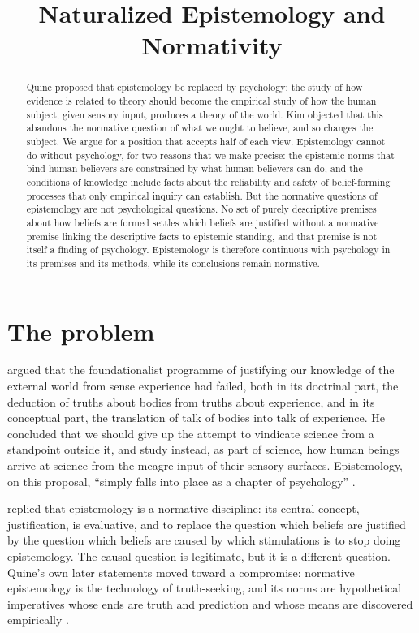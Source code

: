 \documentclass{situationist-preprint}
\title{Naturalized Epistemology and Normativity}
\begin{document}
\maketitle

\begin{abstract}
Quine proposed that epistemology be replaced by psychology: the study of how evidence is related to theory should become the empirical study of how the human subject, given sensory input, produces a theory of the world. Kim objected that this abandons the normative question of what we ought to believe, and so changes the subject. We argue for a position that accepts half of each view. Epistemology cannot do without psychology, for two reasons that we make precise: the epistemic norms that bind human believers are constrained by what human believers can do, and the conditions of knowledge include facts about the reliability and safety of belief-forming processes that only empirical inquiry can establish. But the normative questions of epistemology are not psychological questions. No set of purely descriptive premises about how beliefs are formed settles which beliefs are justified without a normative premise linking the descriptive facts to epistemic standing, and that premise is not itself a finding of psychology. Epistemology is therefore continuous with psychology in its premises and its methods, while its conclusions remain normative.
\end{abstract}

\section{The problem}

\citet{Quine1969} argued that the foundationalist programme of justifying our knowledge of the external world from sense experience had failed, both in its doctrinal part, the deduction of truths about bodies from truths about experience, and in its conceptual part, the translation of talk of bodies into talk of experience. He concluded that we should give up the attempt to vindicate science from a standpoint outside it, and study instead, as part of science, how human beings arrive at science from the meagre input of their sensory surfaces. Epistemology, on this proposal, \enquote{simply falls into place as a chapter of psychology} \citep{Quine1969}.

\citet{Kim1988} replied that epistemology is a normative discipline: its central concept, justification, is evaluative, and to replace the question which beliefs are justified by the question which beliefs are caused by which stimulations is to stop doing epistemology. The causal question is legitimate, but it is a different question. Quine's own later statements moved toward a compromise: normative epistemology is the technology of truth-seeking, and its norms are hypothetical imperatives whose ends are truth and prediction and whose means are discovered empirically \citep{Quine1986}.
\end{document}
